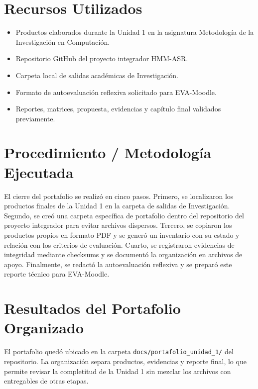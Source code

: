 \documentclass[11pt,a4paper]{article}
\begin{document}
\section{Recursos Utilizados}

\begin{itemize}[leftmargin=1.1cm,itemsep=2pt]
  \item Productos elaborados durante la Unidad 1 en la asignatura Metodología de la Investigación en Computación.
  \item Repositorio GitHub del proyecto integrador HMM-ASR.
  \item Carpeta local de salidas académicas de Investigación.
  \item Formato de autoevaluación reflexiva solicitado para EVA-Moodle.
  \item Reportes, matrices, propuesta, evidencias y capítulo final validados previamente.
\end{itemize}

\section{Procedimiento / Metodología Ejecutada}

El cierre del portafolio se realizó en cinco pasos. Primero, se localizaron los productos finales de la Unidad 1 en la carpeta de salidas de Investigación. Segundo, se creó una carpeta específica de portafolio dentro del repositorio del proyecto integrador para evitar archivos dispersos. Tercero, se copiaron los productos propios en formato PDF y se generó un inventario con su estado y relación con los criterios de evaluación. Cuarto, se registraron evidencias de integridad mediante checksums y se documentó la organización en archivos de apoyo. Finalmente, se redactó la autoevaluación reflexiva y se preparó este reporte técnico para EVA-Moodle.

\section{Resultados del Portafolio Organizado}

El portafolio quedó ubicado en la carpeta \texttt{docs/portafolio\_unidad\_1/} del repositorio. La organización separa productos, evidencias y reporte final, lo que permite revisar la completitud de la Unidad 1 sin mezclar los archivos con entregables de otras etapas.
\end{document}
